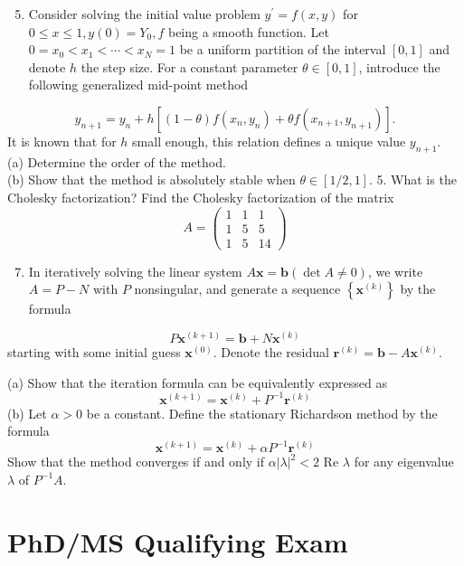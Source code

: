 \documentclass[10pt]{article}
\begin{document}
\begin{enumerate}
  \setcounter{enumi}{4}
  \item Consider solving the initial value problem $y^{\prime}=f(x, y)$ for $0 \leq x \leq 1, y(0)=Y_{0}, f$ being a smooth function. Let $0=x_{0}<x_{1}<\cdots<x_{N}=1$ be a uniform partition of the interval $[0,1]$ and denote $h$ the step size. For a constant parameter $\theta \in[0,1]$, introduce the following generalized mid-point method
\end{enumerate}
$$
y_{n+1}=y_{n}+h\left[(1-\theta) f\left(x_{n}, y_{n}\right)+\theta f\left(x_{n+1}, y_{n+1}\right)\right] .
$$
It is known that for $h$ small enough, this relation defines a unique value $y_{n+1}$.\\
(a) Determine the order of the method.\\
(b) Show that the method is absolutely stable when $\theta \in[1 / 2,1]$. 5. What is the Cholesky factorization? Find the Cholesky factorization of the matrix
$$
A=\left(\begin{array}{ccc}
1 & 1 & 1 \\
1 & 5 & 5 \\
1 & 5 & 14
\end{array}\right)
$$

\begin{enumerate}
  \setcounter{enumi}{6}
  \item In iteratively solving the linear system $A \boldsymbol{x}=\boldsymbol{b}(\operatorname{det} A \neq 0)$, we write $A=P-N$ with $P$ nonsingular, and generate a sequence $\left\{\boldsymbol{x}^{(k)}\right\}$ by the formula
\end{enumerate}
$$
P \boldsymbol{x}^{(k+1)}=\boldsymbol{b}+N \boldsymbol{x}^{(k)}
$$
starting with some initial guess $\boldsymbol{x}^{(0)}$. Denote the residual $\boldsymbol{r}^{(k)}=\boldsymbol{b}-A \boldsymbol{x}^{(k)}$.

(a) Show that the iteration formula can be equivalently expressed as
$$
\boldsymbol{x}^{(k+1)}=\boldsymbol{x}^{(k)}+P^{-1} \boldsymbol{r}^{(k)}
$$
(b) Let $\alpha>0$ be a constant. Define the stationary Richardson method by the formula
$$
\boldsymbol{x}^{(k+1)}=\boldsymbol{x}^{(k)}+\alpha P^{-1} \boldsymbol{r}^{(k)}
$$
Show that the method converges if and only if $\alpha|\lambda|^{2}<2$ Re $\lambda$ for any eigenvalue $\lambda$ of $P^{-1} A$.

\section*{PhD/MS Qualifying Exam }
\end{document}
